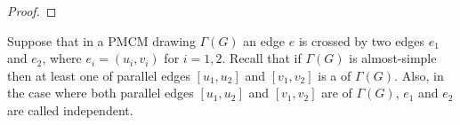 \begin{proof}
\end{proof}

Suppose that in a PMCM drawing $\Gamma(G)$ an edge $e$ is crossed by two edges $e_1$ and $e_2$, where $e_i=(u_i,v_i)$ for $i=1,2$. Recall that if $\Gamma(G)$ is almost-simple then at least one of parallel edges $[u_1,u_2]$ and $[v_1,v_2]$ is a \pe of $\Gamma(G)$. Also, in the case where both parallel edges $[u_1,u_2]$ and $[v_1,v_2]$ are \pes of $\Gamma(G)$, $e_1$ and $e_2$ are called independent.

